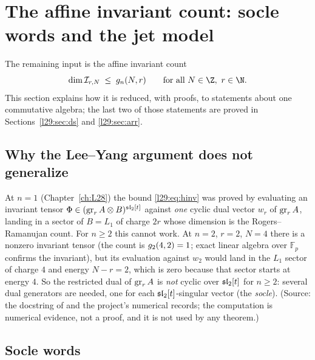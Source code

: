 \section{The affine invariant count: socle words and the jet model}\label{l29:sec:model}

The remaining input is the affine invariant count
\begin{equation}\label{l29:eq:hinv}
\dim\ltwentynineinv_{r,N}\;\le\;\ltwentyninegc_n(N,r)\qquad\text{for all }N\in\Z,\ r\in\N.
\end{equation}
This section explains how it is reduced, with proofs, to statements about one commutative algebra; the last two of
those statements are proved in Sections~\ref{l29:sec:ds} and \ref{l29:sec:arr}.

\subsection{Why the Lee--Yang argument does not generalize}

\begin{warning}[title={Dead end: one cyclic dual vector}]\label{l29:warn:cyclic}
At $n=1$ (Chapter~\ref{ch:L28}) the bound \eqref{l29:eq:hinv} was proved by evaluating an invariant tensor
$\Phi\in(\operatorname{gr}_rA\otimes B)^{\mathfrak{sl}_2[t]}$ against \emph{one} cyclic dual vector $w_r$ of
$\operatorname{gr}_rA$, landing in a sector of $B=L_1$ of charge $2r$ whose dimension is the Rogers--Ramanujan count. For
$n\ge2$ this cannot work. At $n=2$, $r=2$, $N=4$ there is a nonzero invariant tensor (the count is
$g_2(4,2)=1$; exact linear algebra over $\mathbb F_p$ confirms the invariant), but its evaluation against
$w_2$ would land in the $L_1$ sector of charge $4$ and energy $N-r=2$, which is zero because that sector starts at
energy $4$. So the restricted dual of $\operatorname{gr}_rA$ is \emph{not} cyclic over $\mathfrak{sl}_2[t]$ for $n\ge2$:
several dual generators are needed, one for each $\mathfrak{sl}_2[t]$-singular vector (the \emph{socle}). (Source:
the docstring of  and the project's numerical records; the
computation is numerical evidence, not a proof, and it is not used by any theorem.)
\end{warning}

\subsection{Socle words}

